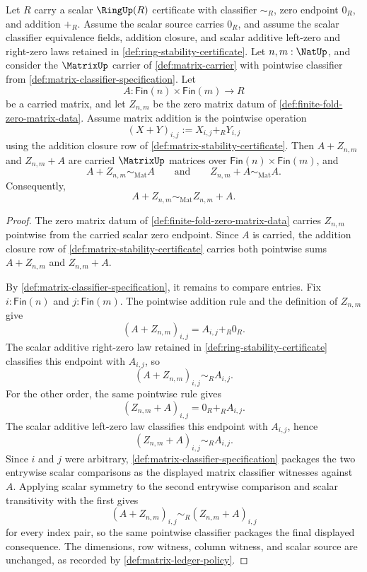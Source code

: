 \begin{theorem}
\label{thm:finite-fold-zero-matrix-additive-identity}
Let $R$ carry a scalar $\RingUp(R)$ certificate with classifier $\sim_R$, zero endpoint $0_R$, and addition $+_R$. Assume the scalar source carries $0_R$, and assume the scalar classifier equivalence fields, addition closure, and scalar additive left-zero and right-zero laws retained in \autoref{def:ring-stability-certificate}. Let $n,m:\NatUp$, and consider the $\MatrixUp$ carrier of \autoref{def:matrix-carrier} with pointwise classifier from \autoref{def:matrix-classifier-specification}. Let
$$
A:\mathsf{Fin}(n)\times\mathsf{Fin}(m)\to R
$$
be a carried matrix, and let $Z_{n,m}$ be the zero matrix datum of \autoref{def:finite-fold-zero-matrix-data}. Assume matrix addition is the pointwise operation
$$
(X+Y)_{i,j}:=X_{i,j}+_R Y_{i,j}
$$
using the addition closure row of \autoref{def:matrix-stability-certificate}. Then $A+Z_{n,m}$ and $Z_{n,m}+A$ are carried $\MatrixUp$ matrices over $\mathsf{Fin}(n)\times\mathsf{Fin}(m)$, and
$$
A+Z_{n,m}\sim_{\mathrm{Mat}}A
\qquad\text{and}\qquad
Z_{n,m}+A\sim_{\mathrm{Mat}}A.
$$
Consequently,
$$
A+Z_{n,m}\sim_{\mathrm{Mat}}Z_{n,m}+A.
$$
\end{theorem}
\begin{proof}
The zero matrix datum of \autoref{def:finite-fold-zero-matrix-data} carries $Z_{n,m}$ pointwise from the carried scalar zero endpoint. Since $A$ is carried, the addition closure row of \autoref{def:matrix-stability-certificate} carries both pointwise sums $A+Z_{n,m}$ and $Z_{n,m}+A$.

By \autoref{def:matrix-classifier-specification}, it remains to compare entries. Fix $i:\mathsf{Fin}(n)$ and $j:\mathsf{Fin}(m)$. The pointwise addition rule and the definition of $Z_{n,m}$ give
$$
(A+Z_{n,m})_{i,j}=A_{i,j}+_R 0_R.
$$
The scalar additive right-zero law retained in \autoref{def:ring-stability-certificate} classifies this endpoint with $A_{i,j}$, so
$$
(A+Z_{n,m})_{i,j}\sim_R A_{i,j}.
$$
For the other order, the same pointwise rule gives
$$
(Z_{n,m}+A)_{i,j}=0_R+_R A_{i,j}.
$$
The scalar additive left-zero law classifies this endpoint with $A_{i,j}$, hence
$$
(Z_{n,m}+A)_{i,j}\sim_R A_{i,j}.
$$
Since $i$ and $j$ were arbitrary, \autoref{def:matrix-classifier-specification} packages the two entrywise scalar comparisons as the displayed matrix classifier witnesses against $A$. Applying scalar symmetry to the second entrywise comparison and scalar transitivity with the first gives
$$
(A+Z_{n,m})_{i,j}\sim_R (Z_{n,m}+A)_{i,j}
$$
for every index pair, so the same pointwise classifier packages the final displayed consequence. The dimensions, row witness, column witness, and scalar source are unchanged, as recorded by \autoref{def:matrix-ledger-policy}.
\end{proof}

